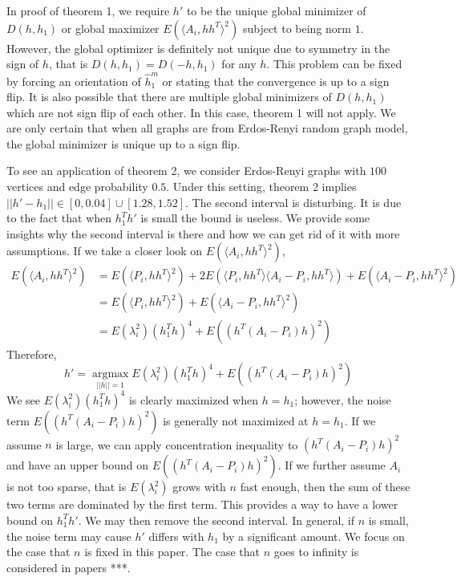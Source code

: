 \documentclass[a4paper]{article}
\newenvironment{remark}[1][Remark]{\begin{trivlist}
\item[\hskip \labelsep {\bfseries #1}]}{\end{trivlist}}
\begin{document}
\begin{remark}
In proof of theorem 1, we require $h'$ to be the unique global minimizer of $D(h,h_1)$ or global maximizer $E(\langle A_i,h h^T \rangle ^2)$ subject to being norm $1$. However, the global optimizer is definitely not unique due to symmetry in the sign of $h$, that is $D(h,h_1)=D(-h,h_1)$ for any $h$. This problem can be fixed by forcing an orientation of $\hat{h}_1^m$ or stating that the convergence is up to a sign flip. It is also possible that there are multiple global minimizers of $D(h,h_1)$ which are not sign flip of each other. In this case, theorem 1 will not apply. We are only certain that when all graphs are from Erdos-Renyi random graph model, the global minimizer is unique up to a sign flip.
\end{remark}

\begin{remark}
To see an application of theorem 2, we consider Erdos-Renyi graphs with $100$ vertices and edge probability $0.5$. Under this setting, theorem 2 implies  $||h'-h_1|| \in [0,0.04] \cup [1.28,1.52]$. The second interval is disturbing. It is due to the fact that when $h_1^T h'$ is small the bound is useless. We provide some insights why the second interval is there and how we can get rid of it with more assumptions. If we take a closer look on $E(\langle A_i,h h^T \rangle ^2)$,
\begin{align*}
E(\langle A_i,h h^T \rangle ^2) &= E(\langle P_i,h h^T \rangle ^2)+2E(\langle P_i,h h^T \rangle \langle A_i-P_i,h h^T \rangle)+E(\langle A_i-P_i,h h^T \rangle ^2) \\
&=E(\langle P_i,h h^T \rangle ^2)+E(\langle A_i-P_i,h h^T \rangle ^2) \\
&=E(\lambda_i^2)(h_1^T h)^4+E((h^T (A_i-P_i)h) ^2)
\end{align*}
Therefore, 
\[h'= \underset{||h|| =1}{\operatorname{argmax}} E(\lambda_i^2)(h_1^T h)^4+E((h^T (A_i-P_i)h) ^2) \]
We see $E(\lambda_i^2)(h_1^T h)^4$ is clearly maximized when $h=h_1$; however, the noise term $E((h^T (A_i-P_i)h) ^2)$ is generally not maximized at $h=h_1$. If we assume $n$ is large, we can apply concentration inequality to $(h^T (A_i-P_i)h) ^2$ and have an upper bound on $E((h^T (A_i-P_i)h) ^2)$. If we further assume $A_i$ is not too sparse, that is $E(\lambda_i^2)$ grows with $n$ fast enough, then the sum of these two terms are dominated by the first term. This provides a way to have a lower bound on $h_1^T h'$. We may then remove the second interval. In general, if $n$ is small, the noise term may cause $h'$ differs with $h_1$ by a significant amount. We focus on the case that $n$ is fixed in this paper. The case that $n$ goes to infinity is considered in papers ***.
\end{remark}
\end{document}
